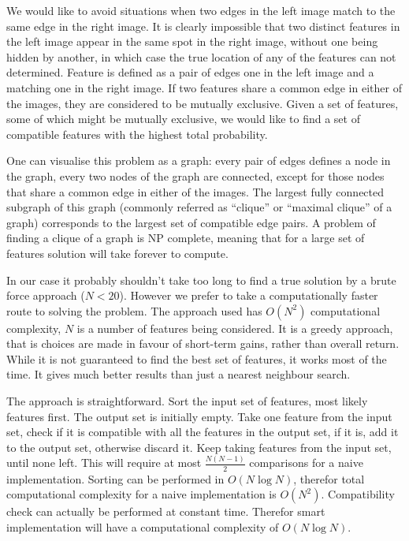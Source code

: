 We would like to avoid situations when two edges in the left image
match to the same edge in the right image. It is clearly impossible
that two distinct features in the left image appear in the same spot
in the right image, without one being hidden by another, in which case
the true location of any of the features can not determined. Feature
is defined as a pair of edges one in the left image and a matching one
in the right image. If two features share a common edge in either of
the images, they are considered to be mutually exclusive.  Given a set
of features, some of which might be mutually exclusive, we would like
to find a set of compatible features with the highest total
probability.

One can visualise this problem as a graph: every pair of edges defines
a node in the graph, every two nodes of the graph are connected,
except for those nodes that share a common edge in either of the
images. The largest fully connected subgraph of this graph (commonly
referred as ``clique'' or ``maximal clique'' of a graph) corresponds
to the largest set of compatible edge pairs. A problem of finding a
clique of a graph is NP complete, meaning that for a large set of
features solution will take forever to compute.

In our case it probably shouldn't take too long to find a true
solution by a brute force approach ($N<20$). However we prefer to take
a computationally faster route to solving the problem. The approach
used has $O(N^2)$ computational complexity, $N$ is a number of
features being considered. It is a greedy approach, that is choices
are made in favour of short-term gains, rather than overall return.
While it is not guaranteed to find the best set of features, it works
most of the time. It gives much better results than just a nearest
neighbour search.

The approach is straightforward. Sort the input set of features, most
likely features first. The output set is initially empty. Take one
feature from the input set, check if it is compatible with all the
features in the output set, if it is, add it to the output set,
otherwise discard it.  Keep taking features from the input set, until
none left. This will require at most $\frac{N(N-1)}{2}$ comparisons
for a naive implementation.  Sorting can be performed in $O(N\log N)$,
therefor total computational complexity for a naive implementation is
$O(N^2)$. Compatibility check can actually be performed at constant
time. Therefor smart implementation will have a computational
complexity of $O(N\log N)$.


